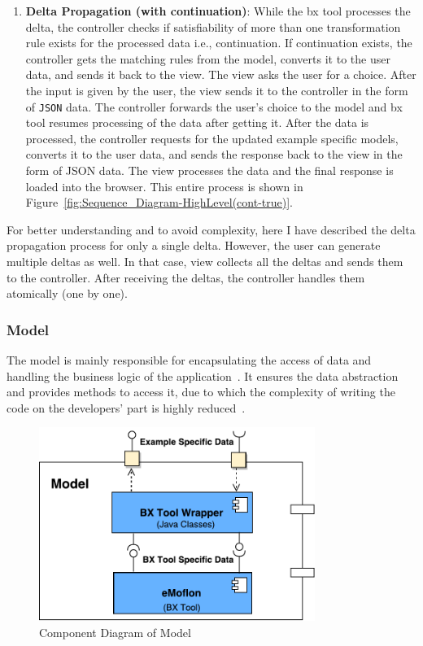 \begin{enumerate}
    \item {\textbf{Delta Propagation (with continuation)}: While the bx tool processes the delta, the controller checks if satisfiability of more than one transformation rule exists for the processed data i.e., continuation. If continuation exists, the controller gets the matching rules from the model, converts it to the user data, and sends it back to the view. The view asks the user for a choice. After the input is given by the user, the view sends it to the controller in the form of \texttt{JSON} data. The controller forwards the user's choice to the model and bx tool resumes processing of the data after getting it. After the data is processed, 
    the controller requests for the updated example specific models, converts it to the user data, and sends the response back to the view in the form of JSON data. The view processes the data and the final response is loaded into the browser. This entire process is shown in Figure~\ref{fig:Sequence_Diagram-HighLevel(cont-true)}.}
\end{enumerate}

For better understanding and to avoid complexity, here I have described the delta propagation process for only a single delta. However, the user can generate multiple deltas as well. In that case, view collects all the deltas and sends them to the controller. After receiving the deltas, the controller handles them atomically (one by one).

\subsubsection{Model}\label{subsubsec:design_model}
The model is mainly responsible for encapsulating the access of data and handling the business logic of the application~\cite{designpattern-headfirst}\cite{mvc-arch}. It ensures the data abstraction and provides methods to access it, due to which the complexity of writing the code on the developers' part is highly reduced~\cite{mdd-webwithmvc}.

\begin{figure}
	\centering
	\includegraphics[width=0.8\textwidth]{figures/Component_Diagram-Model}
	\caption{Component Diagram of Model}
	\label{fig:Component_Diagram-Model}
\end{figure}

